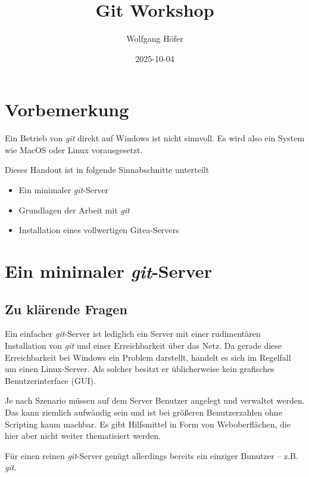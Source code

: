 \documentclass[
  letterpaper,
  DIV=11]{scrreprt}
\title{Git Workshop}
\author{Wolfgang Höfer}
\date{2025-10-04}
\makeatletter
\providecommand{\tightlist}{%
  \setlength{\itemsep}{0pt}\setlength{\parskip}{0pt}}\usepackage{longtable,booktabs,array}
\renewcommand{\maketitle}{\bgroup\setlength{\parindent}{0pt}
\begin{flushleft}
  {\sffamily\huge\textbf{\MakeUppercase{\@title}}} \vspace{0.3cm} \newline
  {\Large {\@subtitle}} \newline
  \@author
\end{flushleft}\egroup
}
\newcommand{\git}{\textit{git}\xspace}
\newcommand{\gitserver}{\textit{git}-Server\xspace}
\makeatother
\begin{document}
\maketitle

\pagestyle{mystyle}



\chapter{Vorbemerkung}\label{vorbemerkung}

Ein Betrieb von \git direkt auf Windows ist nicht sinnvoll. Es wird also
ein System wie MacOS oder Linux vorausgesetzt.

Dieses Handout ist in folgende Sinnabschnitte unterteilt

\begin{itemize}
\tightlist
\item
  Ein minimaler \git-Server
\item
  Grundlagen der Arbeit mit \git
\item
  Installation eines vollwertigen Gitea-Servers
\end{itemize}


\chapter{\texorpdfstring{Ein minimaler
\git-Server}{Ein minimaler -Server}}\label{ein-minimaler--server}

\section{Zu klärende Fragen}\label{zu-kluxe4rende-fragen}

Ein einfacher \git-Server ist lediglich ein Server mit einer
rudimentären Installation von \git und einer Erreichbarkeit über das
Netz. Da gerade diese Erreichbarkeit bei Windows ein Problem darstellt,
handelt es sich im Regelfall um einen Linux-Server. Als solcher besitzt
er üblicherweise kein grafisches Benutzerinterface (GUI).

Je nach Szenario müssen auf dem Server Benutzer angelegt und verwaltet
werden. Das kann ziemlich aufwändig sein und ist bei größeren
Benutzerzahlen ohne Scripting kaum machbar. Es gibt Hilfsmittel in Form
von Weboberflächen, die hier aber nicht weiter thematisiert werden.

Für einen reinen \gitserver genügt allerdings bereits ein einziger
Bunutzer -- z.B. \git.
\end{document}
